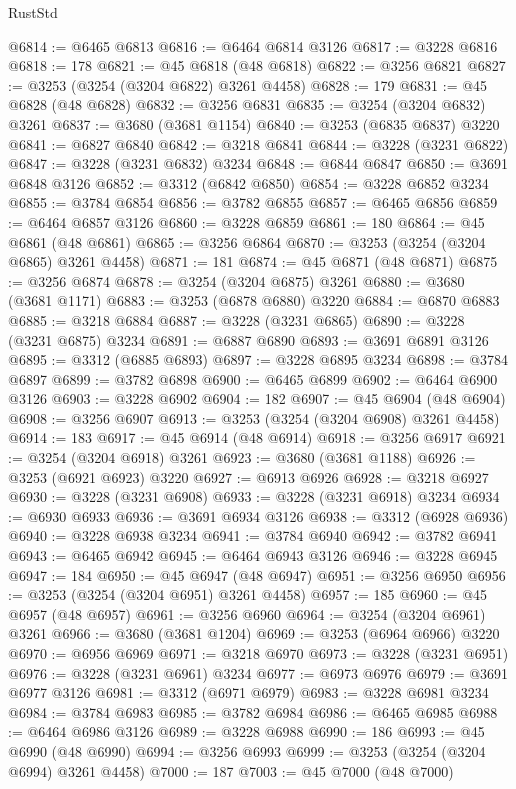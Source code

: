 \begin{lexlean}{RustStd}
\begin{coremodule}
@6814 := @6465 @6813
@6816 := @6464 @6814 @3126
@6817 := @3228 @6816
@6818 := 178
@6821 := @45 @6818 (@48 @6818)
@6822 := @3256 @6821
@6827 := @3253 (@3254 (@3204 @6822) @3261 @4458)
@6828 := 179
@6831 := @45 @6828 (@48 @6828)
@6832 := @3256 @6831
@6835 := @3254 (@3204 @6832) @3261
@6837 := @3680 (@3681 @1154)
@6840 := @3253 (@6835 @6837) @3220
@6841 := @6827 @6840
@6842 := @3218 @6841
@6844 := @3228 (@3231 @6822)
@6847 := @3228 (@3231 @6832) @3234
@6848 := @6844 @6847
@6850 := @3691 @6848 @3126
@6852 := @3312 (@6842 @6850)
@6854 := @3228 @6852 @3234
@6855 := @3784 @6854
@6856 := @3782 @6855
@6857 := @6465 @6856
@6859 := @6464 @6857 @3126
@6860 := @3228 @6859
@6861 := 180
@6864 := @45 @6861 (@48 @6861)
@6865 := @3256 @6864
@6870 := @3253 (@3254 (@3204 @6865) @3261 @4458)
@6871 := 181
@6874 := @45 @6871 (@48 @6871)
@6875 := @3256 @6874
@6878 := @3254 (@3204 @6875) @3261
@6880 := @3680 (@3681 @1171)
@6883 := @3253 (@6878 @6880) @3220
@6884 := @6870 @6883
@6885 := @3218 @6884
@6887 := @3228 (@3231 @6865)
@6890 := @3228 (@3231 @6875) @3234
@6891 := @6887 @6890
@6893 := @3691 @6891 @3126
@6895 := @3312 (@6885 @6893)
@6897 := @3228 @6895 @3234
@6898 := @3784 @6897
@6899 := @3782 @6898
@6900 := @6465 @6899
@6902 := @6464 @6900 @3126
@6903 := @3228 @6902
@6904 := 182
@6907 := @45 @6904 (@48 @6904)
@6908 := @3256 @6907
@6913 := @3253 (@3254 (@3204 @6908) @3261 @4458)
@6914 := 183
@6917 := @45 @6914 (@48 @6914)
@6918 := @3256 @6917
@6921 := @3254 (@3204 @6918) @3261
@6923 := @3680 (@3681 @1188)
@6926 := @3253 (@6921 @6923) @3220
@6927 := @6913 @6926
@6928 := @3218 @6927
@6930 := @3228 (@3231 @6908)
@6933 := @3228 (@3231 @6918) @3234
@6934 := @6930 @6933
@6936 := @3691 @6934 @3126
@6938 := @3312 (@6928 @6936)
@6940 := @3228 @6938 @3234
@6941 := @3784 @6940
@6942 := @3782 @6941
@6943 := @6465 @6942
@6945 := @6464 @6943 @3126
@6946 := @3228 @6945
@6947 := 184
@6950 := @45 @6947 (@48 @6947)
@6951 := @3256 @6950
@6956 := @3253 (@3254 (@3204 @6951) @3261 @4458)
@6957 := 185
@6960 := @45 @6957 (@48 @6957)
@6961 := @3256 @6960
@6964 := @3254 (@3204 @6961) @3261
@6966 := @3680 (@3681 @1204)
@6969 := @3253 (@6964 @6966) @3220
@6970 := @6956 @6969
@6971 := @3218 @6970
@6973 := @3228 (@3231 @6951)
@6976 := @3228 (@3231 @6961) @3234
@6977 := @6973 @6976
@6979 := @3691 @6977 @3126
@6981 := @3312 (@6971 @6979)
@6983 := @3228 @6981 @3234
@6984 := @3784 @6983
@6985 := @3782 @6984
@6986 := @6465 @6985
@6988 := @6464 @6986 @3126
@6989 := @3228 @6988
@6990 := 186
@6993 := @45 @6990 (@48 @6990)
@6994 := @3256 @6993
@6999 := @3253 (@3254 (@3204 @6994) @3261 @4458)
@7000 := 187
@7003 := @45 @7000 (@48 @7000)

\end{coremodule}
\end{lexlean}
